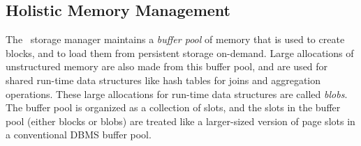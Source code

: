
%
%
%
%
%
%
%
%

\subsection{Holistic Memory Management}
\label{unified-buffer-manager}
The \Quickstep\ storage manager maintains a \textit{buffer pool} of memory that is used to create blocks, and to load them from persistent storage on-demand. Large allocations of unstructured memory are also made from this buffer pool, and are used for shared run-time data structures like hash tables for joins and aggregation operations. These large allocations for run-time data structures are called \textit{blobs}. The buffer pool is organized as a collection of slots, and the slots in the buffer pool (either blocks or  blobs) are treated like a larger-sized version of page slots in a conventional DBMS buffer pool.

